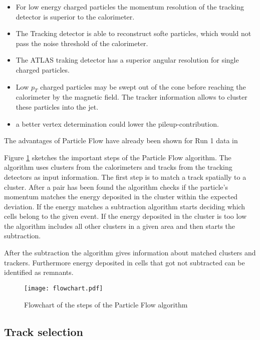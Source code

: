 \begin{itemize}
\item For low energy charged particles the momentum resolution of the tracking detector is superior to the calorimeter.
\item The Tracking detector is able to reconstruct softe particles, which would not pass the noise threshold of the calorimeter.
\item The ATLAS traking detector has a superior angular resolution for single charged particles.
\item Low $p_T$ charged particles may be swept out of the cone before reaching the calorimeter by the magnetic field. The tracker information allows to cluster these particles into the jet.
\item a better vertex determination could lower the pileup-contribution.
\end{itemize}

The advantages of Particle Flow have already been shown for Run 1 data in

Figure \ref{fig:pflowflowchart} sketches the important steps of the Particle Flow algorithm. The algorithm uses clusters from the calorimeters and tracks from the tracking detectors as input information. The first step is to match a track spatially to a cluster. After a pair has been found the algorithm checks if the particle's momentum matches the energy deposited in the cluster within the expected deviation. If the energy matches a subtraction algorithm starts deciding which cells belong to the given event. If the energy deposited in the cluster is too low the algorithm includes all other clusters in a given area and then starts the subtraction.

After the subtraction the algorithm gives information about matched clusters and trackers. Furthermore energy deposited in cells that got not subtracted can be identified as remnants. 

\begin{figure}[h]
  \centering
  \texttt{[image: flowchart.pdf]}
  \caption[Flowchart of the steps of the Particle Flow algorithm]{Flowchart of the steps of the Particle Flow algorithm \cite{salam67}}
  \label{fig:pflowflowchart}
\end{figure}

\subsection{Track selection}

